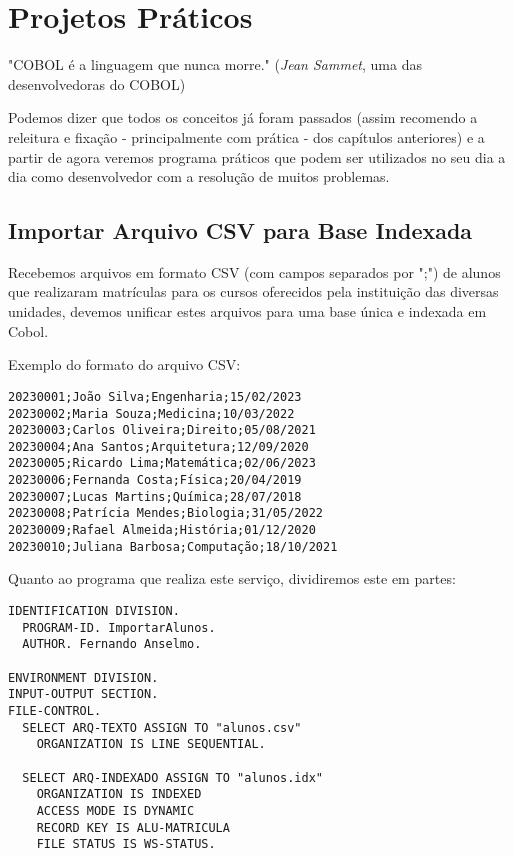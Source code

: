 \chapter{Projetos Práticos}

\begin{remark}
	"COBOL é a linguagem que nunca morre." (\textit{Jean Sammet}, uma das desenvolvedoras do COBOL) 
\end{remark}

Podemos dizer que todos os conceitos já foram passados (assim recomendo a releitura e fixação - principalmente com prática - dos capítulos anteriores) e a partir de agora veremos programa práticos que podem ser utilizados no seu dia a dia como desenvolvedor com a resolução de muitos problemas.

\section{Importar Arquivo CSV para Base Indexada}
Recebemos arquivos em formato CSV (com campos separados por ";") de alunos que realizaram matrículas para os cursos oferecidos pela instituição das diversas unidades, devemos unificar estes arquivos para uma base única e indexada em Cobol.

Exemplo do formato do arquivo CSV:
\begin{lstlisting}[]
20230001;João Silva;Engenharia;15/02/2023
20230002;Maria Souza;Medicina;10/03/2022
20230003;Carlos Oliveira;Direito;05/08/2021
20230004;Ana Santos;Arquitetura;12/09/2020
20230005;Ricardo Lima;Matemática;02/06/2023
20230006;Fernanda Costa;Física;20/04/2019
20230007;Lucas Martins;Química;28/07/2018
20230008;Patrícia Mendes;Biologia;31/05/2022
20230009;Rafael Almeida;História;01/12/2020
20230010;Juliana Barbosa;Computação;18/10/2021
\end{lstlisting}

Quanto ao programa que realiza este serviço, dividiremos este em partes:
\begin{lstlisting}[]
IDENTIFICATION DIVISION.
  PROGRAM-ID. ImportarAlunos.
  AUTHOR. Fernando Anselmo.

ENVIRONMENT DIVISION.
INPUT-OUTPUT SECTION.
FILE-CONTROL.
  SELECT ARQ-TEXTO ASSIGN TO "alunos.csv"
    ORGANIZATION IS LINE SEQUENTIAL.

  SELECT ARQ-INDEXADO ASSIGN TO "alunos.idx"
    ORGANIZATION IS INDEXED
    ACCESS MODE IS DYNAMIC
    RECORD KEY IS ALU-MATRICULA
    FILE STATUS IS WS-STATUS.	
\end{lstlisting}

